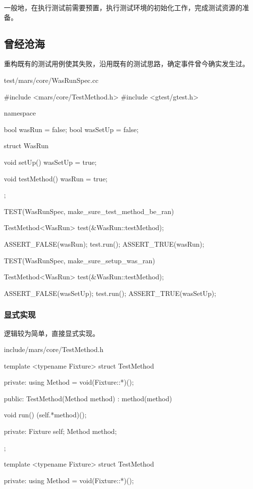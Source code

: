 \begin{content}

一般地，在执行测试前需要预置，执行测试环境的初始化工作，完成测试资源的准备。

\subsection{曾经沧海}

重构既有的测试用例使其失败，沿用既有的测试思路，确定事件曾今确实发生过。

\begin{nodiff}{test/mars/core/WasRunSpec.cc}
\begin{c++}
#include <mars/core/TestMethod.h>
#include <gtest/gtest.h>

namespace {
  bool wasRun = false;
  bool wasSetUp = false;

  struct WasRun {
    void setUp() {
      wasSetUp = true;
    }

    void testMethod() {
      wasRun = true;
    }
  };
}

TEST(WasRunSpec, make_sure_test_method_be_ran) {
  TestMethod<WasRun> test(&WasRun::testMethod);

  ASSERT_FALSE(wasRun);
  test.run();
  ASSERT_TRUE(wasRun);
}

TEST(WasRunSpec, make_sure_setup_was_ran) {
  TestMethod<WasRun> test(&WasRun::testMethod);

  ASSERT_FALSE(wasSetUp);
  test.run();
  ASSERT_TRUE(wasSetUp);
}
\end{c++}
\end{nodiff}

\subsubsection{显式实现}

逻辑较为简单，直接显式实现。

\begin{diff}{include/mars/core/TestMethod.h}
\begin{minicpp}
template <typename Fixture>
struct TestMethod {
private:
  using Method = void(Fixture::*)();

public:
  TestMethod(Method method)
    : method(method) {}

  void run() {
    (self.*method)();
  }

private:
  Fixture self;
  Method method;
};
\end{minicpp}
\tcblower
\begin{minicpp}
template <typename Fixture>
struct TestMethod {
private:
  using Method = void(Fixture::*)();

}
\end{minicpp}
\end{diff}
\end{content}
